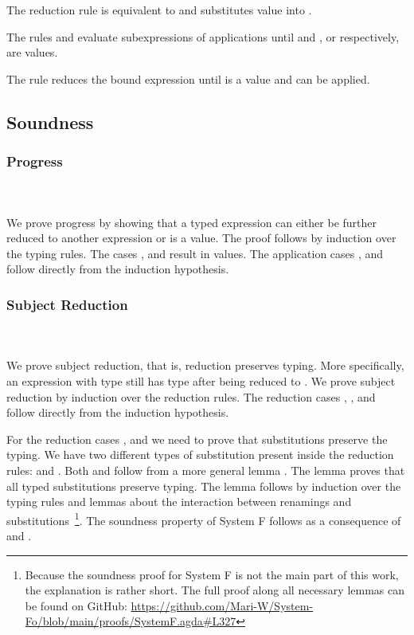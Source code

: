 \noindent The reduction rule  is equivalent to  and substitutes value  into . 

\noindent The rules  and  evaluate subexpressions of applications until  and , or  respectively, are values. 

\noindent The rule  reduces the bound expression  until  is a value and  can be applied. 

\subsection{Soundness}

\subsubsection{Progress}\hfill\\\\
We prove progress by showing that a typed expression  can either be further reduced to another expression  or  is a value. The proof follows by induction over the typing rules. 
\FProgress
The cases ,  and  result in values. 
The application cases ,  and  follow directly from the induction hypothesis. 
\subsubsection{Subject Reduction}\hfill\\\\
We prove subject reduction, that is, reduction preserves typing. More specifically, an expression  with type  still has type  after being reduced to . We prove subject reduction by induction over the reduction rules. 
\FSubjectReduction
The  reduction cases , ,  and  follow directly from the induction hypothesis. 

\noindent For the  reduction cases ,  and  we need to prove that substitutions preserve the typing. We have two different types of substitution present inside the reduction rules:  \Data{[}  \Data{]} and  \Data{[}  \Data{]}.
Both  and  follow from a more general lemma . The lemma  proves that all typed substitutions preserve typing.
\Fpreserves
The lemma  follows by induction over the typing rules and lemmas about the interaction between renamings and substitutions~\footnote{Because the soundness proof for System F is not the main part of this work, the explanation is rather short. The full proof along all necessary lemmas can be found on GitHub: \url{https://github.com/Mari-W/System-Fo/blob/main/proofs/SystemF.agda\#L327}}.
\noindent The soundness property of System F follows as a consequence of  and . 